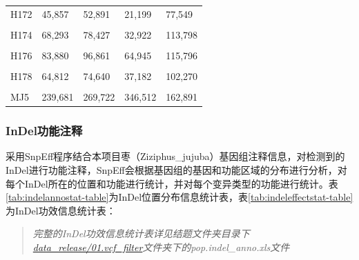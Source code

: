 \documentclass[
  a4paper,
  titlepage]{article}
\begin{document}
\begin{longtable}[t]{lllll}
H172 & 45,857 & 52,891 & 21,199 & 77,549\\
 
\cellcolor{gray!6}{H173} & \cellcolor{gray!6}{60,812} & \cellcolor{gray!6}{68,469} & \cellcolor{gray!6}{36,688} & \cellcolor{gray!6}{92,593}\\
 
H174 & 68,293 & 78,427 & 32,922 & 113,798\\
 
\cellcolor{gray!6}{H175} & \cellcolor{gray!6}{62,784} & \cellcolor{gray!6}{70,972} & \cellcolor{gray!6}{30,962} & \cellcolor{gray!6}{102,794}\\
 
H176 & 83,880 & 96,861 & 64,945 & 115,796\\
 
\cellcolor{gray!6}{H177} & \cellcolor{gray!6}{74,687} & \cellcolor{gray!6}{85,368} & \cellcolor{gray!6}{42,402} & \cellcolor{gray!6}{117,653}\\
 
H178 & 64,812 & 74,640 & 37,182 & 102,270\\
 
\cellcolor{gray!6}{H179} & \cellcolor{gray!6}{70,069} & \cellcolor{gray!6}{80,129} & \cellcolor{gray!6}{39,125} & \cellcolor{gray!6}{111,073}\\
 
MJ5 & 239,681 & 269,722 & 346,512 & 162,891\\*
\end{longtable}

\hypertarget{indelux529fux80fdux6ce8ux91ca}{%
\subsubsection{InDel功能注释}\label{indelux529fux80fdux6ce8ux91ca}}

采用SnpEff程序结合本项目枣（Ziziphus\_jujuba）基因组注释信息，对检测到的InDel进行功能注释，SnpEff会根据基因组的基因和功能区域的分布进行分析，对每个InDel所在的位置和功能进行统计，并对每个变异类型的功能进行统计。表\ref{tab:indelannostat-table}为InDel位置分布信息统计表，表\ref{tab:indeleffectstat-table}为InDel功效信息统计表：

\begin{quote}
\emph{完整的InDel功效信息统计表详见结题文件夹目录下\href{./data_release/01.vcf_filter}{data\_release/01.vcf\_filter}文件夹下的pop.indel\_anno.xls文件}
\end{quote}
\end{document}
